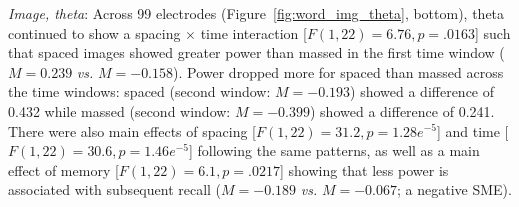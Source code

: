 \textit{Image, theta}: Across 99 electrodes (Figure~\ref{fig:word_img_theta}, bottom), theta continued to show a spacing $\times$ time interaction [$F(1,22)=6.76, p=.0163$] such that spaced images showed greater power than massed in the first time window ($M=0.239$ \textit{vs.} $M=-0.158$).  Power dropped more for spaced than massed across the time windows: spaced (second window: $M=-0.193$) showed a difference of 0.432 while massed (second window: $M=-0.399$) showed a difference of 0.241.
There were also main effects of spacing [$F(1,22)=31.2, p=1.28e^{-5}$] and time [$F(1,22)=30.6, p=1.46e^{-5}$] following the same patterns, as well as a main effect of memory [$F(1,22)=6.1, p=.0217$] showing that less power is associated with subsequent recall ($M=-0.189$ \textit{vs.} $M=-0.067$; a negative SME).

